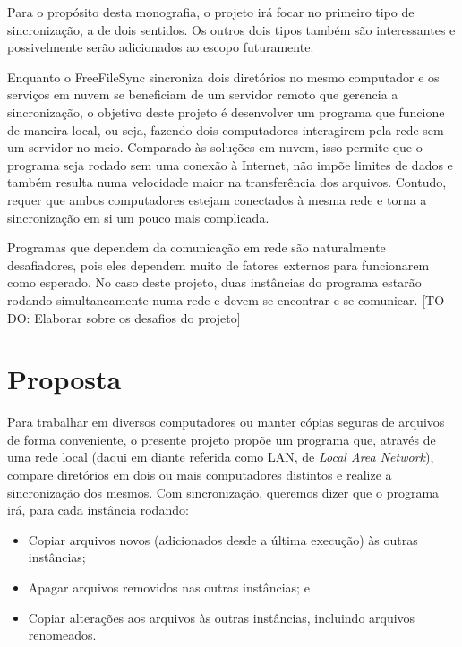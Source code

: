 Para o propósito desta monografia, o projeto irá focar no primeiro tipo de sincronização, a de dois sentidos.
Os outros dois tipos também são interessantes e possivelmente serão adicionados ao escopo futuramente.

Enquanto o FreeFileSync sincroniza dois diretórios no mesmo computador e os serviços em nuvem se beneficiam de um servidor remoto que gerencia a sincronização, o objetivo deste projeto é desenvolver um programa que funcione de maneira local, ou seja, fazendo dois computadores interagirem pela rede sem um servidor no meio.
Comparado às soluções em nuvem, isso permite que o programa seja rodado sem uma conexão à Internet, não impõe limites de dados e também resulta numa velocidade maior na transferência dos arquivos.
Contudo, requer que ambos computadores estejam conectados à mesma rede e torna a sincronização em si um pouco mais complicada.

Programas que dependem da comunicação em rede são naturalmente desafiadores, pois eles dependem muito de fatores externos para funcionarem como esperado.
No caso deste projeto, duas instâncias do programa estarão rodando simultaneamente numa rede e devem se encontrar e se comunicar.
[TO-DO: Elaborar sobre os desafios do projeto]

\section{Proposta}
Para trabalhar em diversos computadores ou manter cópias seguras de arquivos de forma conveniente, o presente projeto propõe um programa que, através de uma rede local (daqui em diante referida como LAN, de \textit{Local Area Network}), compare diretórios em dois ou mais computadores distintos e realize a sincronização dos mesmos.
Com sincronização, queremos dizer que o programa irá, para cada instância rodando:
\begin{itemize}
    \item Copiar arquivos novos (adicionados desde a última execução) às outras instâncias;
    \item Apagar arquivos removidos nas outras instâncias; e
    \item Copiar alterações aos arquivos às outras instâncias, incluindo arquivos renomeados.
\end{itemize}